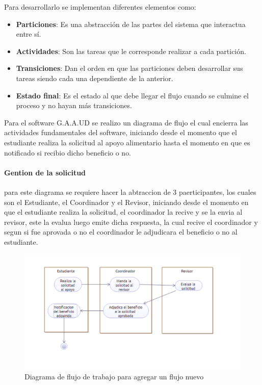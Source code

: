 Para desarrollarlo se implementan diferentes elementos como:

\begin{itemize}
	\item \textbf{Particiones}: Es una abstracción de las partes del sistema que interactua entre sí.
	\item \textbf{Actividades}: Son las tareas que le corresponde realizar a cada partición.
	\item \textbf{Transiciones}: Dan el orden en que las particiones deben desarrollar sus tareas siendo cada una dependiente de la anterior.	
	\item \textbf{Estado final}: Es el estado al que debe llegar el flujo cuando se culmine el proceso y no hayan más transiciones.
\end{itemize}

Para el software G.A.A.UD se realizo un diagrama de flujo el cual encierra las actividades fundamentales del software, iniciando desde el momento que el estudiante realiza la solicitud al apoyo alimentario hasta el momento en que es notificado si recibio dicho beneficio o no.

\paragraph{Gention de la solicitud}

 para este diagrama se requiere hacer la abtraccion de 3 paerticipantes, los cuales son el Estudiante, el Coordinador y el Revisor, iniciando desde el momento en que el estudiante realiza la solicitud, el coordinador la recive y se la envia al revisor, este la evalua luego emite dicha respuesta, la cual recive el coordinador  y segun si fue aprovada o no el coordinador le adjudicara el beneficio o no al estudiante.

\begin{figure}[H]
	\centering
	\includegraphics[width=1\linewidth]{parte2/imgs/DiagramaDeFlujoDeTrabajo/Actividades}
	\caption{Diagrama de flujo de trabajo para agregar un flujo nuevo}
	\label{fig:workflowAgregarFlujo}
\end{figure}

